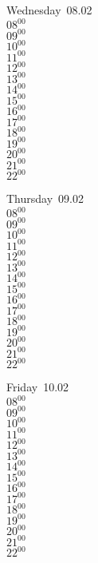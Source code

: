 \documentclass[11pt,a4paper]{book}\usepackage[]{graphicx}\usepackage[]{color}
\begin{document}
\begin{weekdaybox}
  Wednesday~08.02\\
  { 
  \vfill
  $08^{00}$\\
$09^{00}$\\
$10^{00}$\\
$11^{00}$\\
$12^{00}$\\
$13^{00}$\\
$14^{00}$\\
$15^{00}$\\
$16^{00}$\\
$17^{00}$\\
$18^{00}$\\
$19^{00}$\\
$20^{00}$\\
$21^{00}$\\
$22^{00}$\\
  }
\end{weekdaybox}
\clearpage
\begin{headerbox}
\end{headerbox}
\begin{weekdaybox}
  Thursday~09.02\\
  { 
  \vfill
  $08^{00}$\\
$09^{00}$\\
$10^{00}$\\
$11^{00}$\\
$12^{00}$\\
$13^{00}$\\
$14^{00}$\\
$15^{00}$\\
$16^{00}$\\
$17^{00}$\\
$18^{00}$\\
$19^{00}$\\
$20^{00}$\\
$21^{00}$\\
$22^{00}$\\
  }
\end{weekdaybox} 
\begin{weekdaybox}
  Friday~10.02\\
  { 
  \vfill
  $08^{00}$\\
$09^{00}$\\
$10^{00}$\\
$11^{00}$\\
$12^{00}$\\
$13^{00}$\\
$14^{00}$\\
$15^{00}$\\
$16^{00}$\\
$17^{00}$\\
$18^{00}$\\
$19^{00}$\\
$20^{00}$\\
$21^{00}$\\
$22^{00}$\\
  }
\end{weekdaybox}
\end{document}
